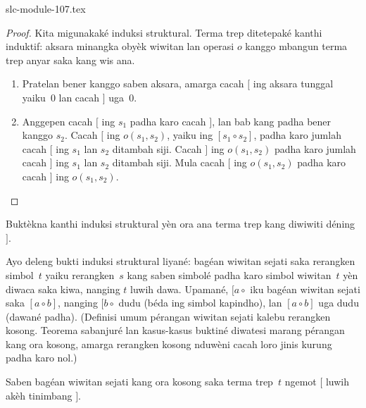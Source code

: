 \begin{filecontents*}[overwrite]{slc-module-107.tex}
\begin{proof}
Kita migunakaké induksi
struktural. Terma trep
ditetepaké kanthi
induktif: aksara minangka
obyèk wiwitan lan operasi
$o$ kanggo mbangun terma
trep anyar saka kang wis ana.
\begin{enumerate}
\item Pratelan bener kanggo
  saben aksara, amarga
  cacah $[$ ing aksara
  tunggal yaiku~$0$ lan
  cacah $]$ uga~$0$.
\item Anggepen cacah $[$
  ing $s_1$ padha karo
  cacah $]$, lan bab kang
  padha bener kanggo $s_2$.
  Cacah $[$ ing
  $o(s_1, s_2)$, yaiku
  ing $[s_1 \circ s_2]$,
  padha karo jumlah cacah
  $[$ ing $s_1$ lan
  $s_2$ ditambah siji.
  Cacah $]$ ing
  $o(s_1, s_2)$ padha
  karo jumlah cacah $]$
  ing $s_1$ lan $s_2$
  ditambah siji. Mula
  cacah $[$ ing
  $o(s_1, s_2)$ padha
  karo cacah $]$ ing
  $o(s_1,s_2)$.
\end{enumerate}
\end{proof}

\begin{prob}
  Buktèkna kanthi induksi
  struktural yèn ora ana
  terma trep kang diwiwiti
  déning~$]$.
\end{prob}

Ayo deleng bukti induksi
struktural liyané: bagéan
wiwitan sejati saka rerangken
simbol~$t$ yaiku rerangken~$s$ kang saben
simbolé padha karo simbol
wiwitan~$t$ yèn diwaca
saka kiwa, nanging $t$
luwih dawa. Upamané,
$[a \circ {}$ iku bagéan
wiwitan sejati saka
$[a \circ b]$, nanging
$[b \circ {}$ dudu
(béda ing simbol kapindho),
lan $[a
\circ b]$ uga dudu
(dawané padha).
(Definisi umum pérangan wiwitan sejati kalebu rerangken kosong. Teorema sabanjuré lan kasus-kasus buktiné diwatesi marang pérangan kang ora kosong, amarga rerangken kosong nduwèni cacah loro jinis kurung padha karo nol.)

\begin{prop}
  Saben bagéan wiwitan sejati
  kang ora kosong saka terma
  trep~$t$ ngemot $[$ luwih
  akèh tinimbang $]$.
\end{prop}


\end{filecontents*}
